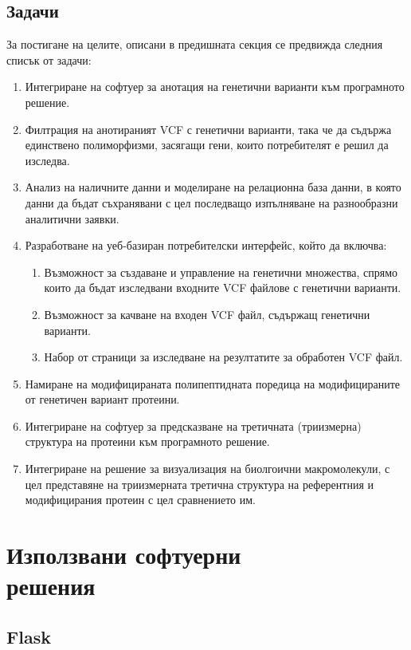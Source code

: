 \documentclass[pdftex,cyrillic,14pt,a4page,twoside,openright]{extreport}
\begin{document}
\section{Задачи}
За постигане на целите, описани в предишната секция се предвижда следния списък от задачи:
\begin{enumerate}
	\item Интегриране на софтуер за анотация на генетични варианти към програмното решение.
	\item Филтрация на анотираният VCF с генетични варианти, така че да съдържа единствено полиморфизми, засягащи гени, които потребителят е решил да изследва.
	\item Анализ на наличните данни и моделиране на релационна база данни, в която данни да бъдат съхранявани с цел последващо изпълняване на разнообразни аналитични заявки.
	\item Разработване на уеб-базиран потребителски интерфейс, който да включва:
		\begin{enumerate}
			\item Възможност за създаване и управление на генетични множества, спрямо които да бъдат изследвани входните VCF файлове с генетични варианти.
			\item Възможност за качване на входен VCF файл, съдържащ генетични варианти.
			\item Набор от страници за изследване на резултатите за обработен VCF файл.
		\end{enumerate}
	\item Намиране на модифицираната полипептидната поредица на модифицираните от генетичен вариант протеини.
	\item Интегриране на софтуер за предсказване на третичната (триизмерна) структура на протеини към програмното решение.
	\item Интегриране на решение за визуализация на биолгоични макромолекули, с цел представяне на триизмерната третична структура на референтния и модифицирания протеин с цел сравнението им.
\end{enumerate}
\chapter[Използвани софтуерни решения]{Използвани софтуерни\\ решения}
\section{Flask}
\end{document}
